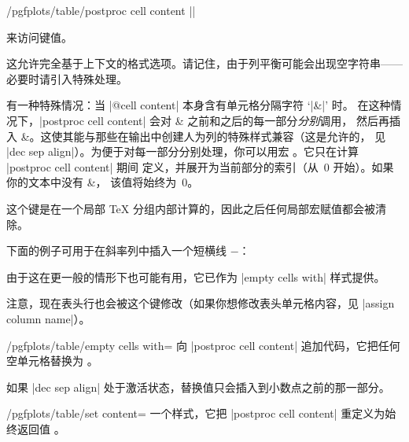 \documentclass[a4paper,doc2]{ltxdoc}
\begin{document}
\begin{codekey}{/pgfplots/table/postproc cell content}
    ||

    来访问键值。

    这允许完全基于上下文的格式选项。请记住，由于列平衡可能会出现空字符串——
    必要时请引入特殊处理。

    有一种特殊情况：当 |@cell content| 本身含有单元格分隔字符 `|&|' 时。
    在这种情况下，|postproc cell content| 会对 & 之前和之后的每一部分\emph{分别}调用，
    然后再插入 &。这使其能与那些在输出中创建人为列的特殊样式兼容（这是允许的，
    见 |dec sep align|）。为便于对每一部分分别处理，你可以用宏
    \declareandlabel{\pgfplotstablepartno}。它只在计算 |postproc cell content| 期间
    定义，并展开为当前部分的索引（从~$0$ 开始）。如果你的文本中没有 &，
    该值将始终为~$0$。

    这个键是在一个局部 \TeX{} 分组内部计算的，因此之后任何局部宏赋值都会被清除。

    下面的例子可用于在斜率列中插入一个短横线 $-$：
\begin{codeexample}[]

\end{codeexample}
    由于这在更一般的情形下也可能有用，它已作为 |empty cells with| 样式提供。

    注意，现在表头行也会被这个键修改（如果你想修改表头单元格内容，见
    |assign column name|）。
\end{codekey}

\begin{stylekey}{/pgfplots/table/empty cells with=}
    向 |postproc cell content| 追加代码，它把任何空单元格替换为 。

    如果 |dec sep align| 处于激活状态，替换值只会插入到小数点之前的那一部分。
\end{stylekey}

\begin{stylekey}{/pgfplots/table/set content=}
    一个样式，它把 |postproc cell content| 重定义为始终返回值 。
\end{stylekey}
\end{document}
